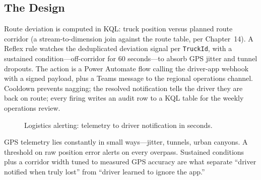 \subsection{The Design}
Route deviation is computed in KQL: truck position versus planned route corridor (a stream-to-dimension join against the route table, per Chapter~14). A Reflex rule watches the deduplicated deviation signal per \texttt{TruckId}, with a sustained condition---off-corridor for 60 seconds---to absorb GPS jitter and tunnel dropouts. The action is a Power Automate flow calling the driver-app webhook with a signed payload, plus a Teams message to the regional operations channel. Cooldown prevents nagging; the resolved notification tells the driver they are back on route; every firing writes an audit row to a KQL table for the weekly operations review.

\begin{figure}[H]
    \centering
    \caption{Logistics alerting: telemetry to driver notification in seconds.}
    \label{fig:chapter15-logistics}
\end{figure}

\begin{pitfall}
GPS telemetry lies constantly in small ways---jitter, tunnels, urban canyons. A threshold on raw position error alerts on every overpass. Sustained conditions plus a corridor width tuned to measured GPS accuracy are what separate ``driver notified when truly lost'' from ``driver learned to ignore the app.''
\end{pitfall}


